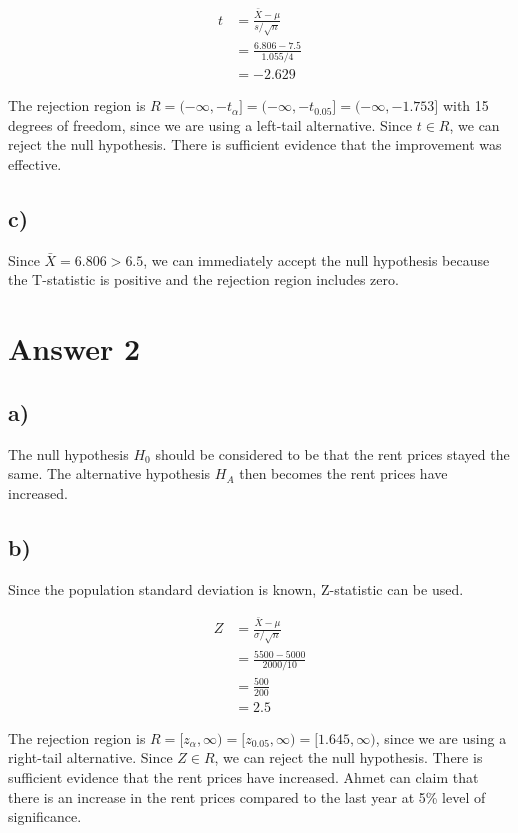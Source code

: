 \documentclass[12pt]{article}
\begin{document}
\begin{align*}
    \textit{t} &= \frac{\bar{X} - \mu}{s / \sqrt{n}} \\[0.75ex]
    &= \frac{6.806 - 7.5}{1.055 / 4} \\[0.75ex]
    &= -2.629
\end{align*}

The rejection region is $R = (-\infty, -\textit{t}_{\alpha}] = (-\infty,
-\textit{t}_{0.05}] = (-\infty, -1.753]$ with 15 degrees of freedom, since we
are using a left-tail alternative. Since $t \in R$, we can reject the null
hypothesis. There is sufficient evidence that the improvement was effective.

\subsection*{c)}

Since $\bar{X} = 6.806 > 6.5$, we can immediately accept the null hypothesis
because the T-statistic is positive and the rejection region includes zero.

\section*{Answer 2}
\subsection*{a)}

The null hypothesis $H_0$ should be considered to be that the rent prices stayed
the same. The alternative hypothesis $H_A$ then becomes the rent prices have
increased.

\subsection*{b)}

Since the population standard deviation is known, Z-statistic can be used.

\begin{align*}
    Z &= \frac{\bar{X}-\mu}{\sigma / \sqrt{n}} \\[0.75ex]
    &= \frac{5500 - 5000}{2000 / 10} \\[0.75ex]
    &= \frac{500}{200} \\[0.75ex]
    &= 2.5
\end{align*}

The rejection region is $R = [\textit{z}_{\alpha}, \infty) = [\textit{z}_{0.05},
\infty) = [1.645, \infty)$, since we are using a right-tail alternative. Since
$Z \in R$, we can reject the null hypothesis. There is sufficient evidence that
the rent prices have increased. Ahmet can claim that there is an increase in the
rent prices compared to the last year at 5\% level of significance.
\end{document}

